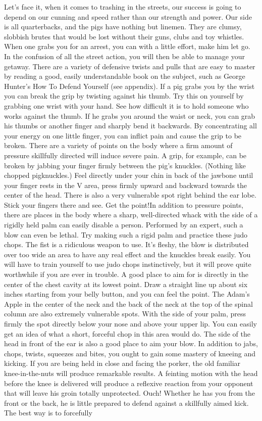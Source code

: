 \documentclass[11pt,twoside,a4paper]{book}
\begin{document}
	Let's face it, when it comes to trashing in the streets, our success is going to depend on our cunning and speed rather than our strength and power. Our side is all quarterbacks, and the pigs have nothing but linemen. They are clumsy, slobbish brutes that would be lost without their guns, clubs and toy whistles. When one grabs you for an arrest, you can with a little effort, make him let go. In the confusion of all the street action, you will then be able to manage your getaway. There are a variety of defensive twists and pulls that are easy to master by reading a good, easily understandable book on the subject, such as George Hunter's How To Defend Yourself (see appendix). If a pig grabs you by the wrist you can break the grip by twisting against his thumb. Try this on yourself by grabbing one wrist with your hand. See how difficult it is to hold someone who works against the thumb. If he grabs you around the waist or neck, you can grab his thumbs or another finger and sharply bend it backwards. By concentrating all your energy on one little finger, you can inflict pain and cause the grip to be broken. There are a variety of points on the body where a firm amount of pressure skillfully directed will induce severe pain. A grip, for example, can be broken by jabbing your finger firmly between the pig's knuckles. (Nothing like chopped pigknuckles.) Feel directly under your chin in back of the jawbone until your finger rests in the V area, press firmly upward and backward towards the center of the head. There is also a very vulnerable spot right behind the ear lobe. Stick your fingers there and see. Get the point!In addition to pressure points, there are places in the body where a sharp, well-directed whack with the side of a rigidly held palm can easily disable a person. Performed by an expert, such a blow can even be lethal. Try making such a rigid palm and practice these judo chops. The fist is a ridiculous weapon to use. It's fleshy, the blow is distributed over too wide an area to have any real effect and the knuckles break easily. You will have to train yourself to use judo chops instinctively, but it will prove quite worthwhile if you are ever in trouble. A good place to aim for is directly in the center of the chest cavity at its lowest point. Draw a straight line up about six inches starting from your belly button, and you can feel the point. The Adam's Apple in the center of the neck and the back of the neck at the top of the spinal column are also extremely vulnerable spots. With the side of your palm, press firmly the spot directly below your nose and above your upper lip. You can easily get an idea of what a short, forceful chop in this area would do. The side of the head in front of the ear is also a good place to aim your blow. In addition to jabs, chops, twists, squeezes and bites, you ought to gain some mastery of kneeing and kicking. If you are being held in close and facing the porker, the old familiar knee-in-the-nuts will produce remarkable results. A feinting motion with the head before the knee is delivered will produce a reflexive reaction from your opponent that will leave his groin totally unprotected. Ouch! Whether he has you from the front or the back, he is little prepared to defend against a skillfully aimed kick. The best way is to forcefully 
\end{document}
